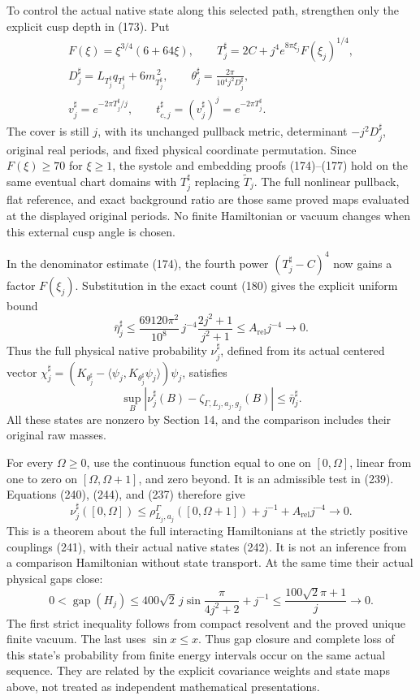 \documentclass[
  11pt,
]{article}
\begin{document}
To control the actual native state along this selected path, strengthen
only the explicit cusp depth in (173). Put \[
 \begin{gathered}
 F(\xi)=\xi^{3/4}(6+64\xi),\qquad
 T_j^\sharp=2C+j^4e^{8\pi\xi_j}F(\xi_j)^{1/4},\\
 D_j^\sharp=L_{T_j^\sharp}q_{T_j^\sharp}+6m_{T_j^\sharp}^{\,2},
 \qquad
 \theta_j^\sharp=\frac{2\pi}{10^4j^2D_j^\sharp},\\
 v_j^\sharp=e^{-2\pi T_j^\sharp/j},\qquad
 t_{c,j}^\sharp=(v_j^\sharp)^j=e^{-2\pi T_j^\sharp}.
 \end{gathered}
 \tag{242}
\] The cover is still \(j\), with its unchanged pullback metric,
determinant \(-j^2D_j^\sharp\), original real periods, and fixed
physical coordinate permutation. Since \(F(\xi)\ge70\) for \(\xi\ge1\),
the systole and embedding proofs (174)--(177) hold on the same eventual
chart domains with \(T_j^\sharp\) replacing \(\widetilde T_j\). The full
nonlinear pullback, flat reference, and exact background ratio are those
same proved maps evaluated at the displayed original periods. No finite
Hamiltonian or vacuum changes when this external cusp angle is chosen.

In the denominator estimate (174), the fourth power \((T_j^\sharp-C)^4\)
now gains a factor \(F(\xi_j)\). Substitution in the exact count (180)
gives the explicit uniform bound \[
 \bar\eta_j^\sharp
 \le\frac{69120\pi^2}{10^8}\,j^{-4}
          \frac{2j^2+1}{j^2+1}
 \le A_{\mathrm{rel}}j^{-4}\longrightarrow0.
 \tag{243}
\] Thus the full physical native probability \(\nu_j^\sharp\), defined
from its actual centered vector \(\chi_j^\sharp=(K_{\theta_j^\sharp}
-\langle\psi_j,K_{\theta_j^\sharp}\psi_j\rangle)\psi_j\), satisfies \[
 \sup_B|\nu_j^\sharp(B)-\zeta_{\Gamma,L_j,a_j,g_j}(B)|
       \le\bar\eta_j^\sharp.
 \tag{244}
\] All these states are nonzero by Section 14, and the comparison
includes their original raw masses.

For every \(\Omega\ge0\), use the continuous function equal to one on
\([0,\Omega]\), linear from one to zero on \([\Omega,\Omega+1]\), and
zero beyond. It is an admissible test in (239). Equations (240), (244),
and (237) therefore give \[
 \nu_j^\sharp([0,\Omega])
 \le \rho_{L_j,a_j}^{\Gamma}([0,\Omega+1])
                      +j^{-1}+A_{\mathrm{rel}}j^{-4}
 \longrightarrow0.
 \tag{245}
\] This is a theorem about the full interacting Hamiltonians at the
strictly positive couplings (241), with their actual native states
(242). It is not an inference from a comparison Hamiltonian without
state transport. At the same time their actual physical gaps close: \[
 0<\operatorname{gap}(H_j)
 \le400\sqrt2\,j\sin\frac{\pi}{4j^2+2}+j^{-1}
 \le\frac{100\sqrt2\pi+1}{j}\longrightarrow0.
 \tag{246}
\] The first strict inequality follows from compact resolvent and the
proved unique finite vacuum. The last uses \(\sin x\le x\). Thus gap
closure and complete loss of this state's probability from finite energy
intervals occur on the same actual sequence. They are related by the
explicit covariance weights and state maps above, not treated as
independent mathematical presentations.
\end{document}
